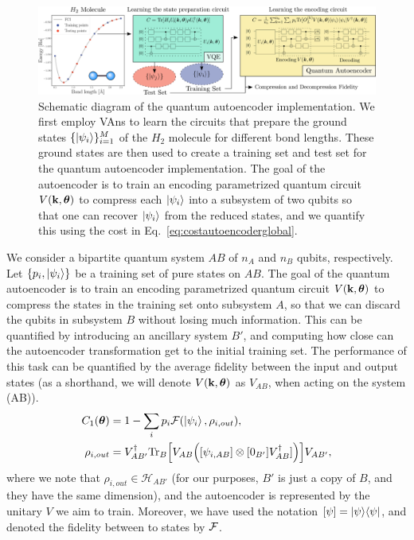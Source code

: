 \begin{figure}[t!]
\centering
\includegraphics[width=1.\textwidth]{Figures/VANS/Fig10.pdf}
\caption{Schematic diagram of the quantum autoencoder implementation. We first employ VAns to learn the circuits that prepare the ground states $\{\ket{\psi_i}\}_{i=1}^M$ of the $H_2$ molecule for different bond lengths. These ground states are then used to create a training set and test set for the quantum autoencoder implementation. The goal of the autoencoder is to train an encoding parametrized quantum circuit $V(\mathbf{k}, \bm{\theta})$ to compress each $\ket{\psi_i}$ into a subsystem of two qubits so that one can recover $\ket{\psi_i}$ from the reduced states, and we quantify this using the cost in Eq.~\ref{eq:costautoencoderglobal}.}
\label{fig:AE}
\end{figure}

We consider a bipartite quantum system $AB$ of $n_A$ and $n_B$ qubits, respectively. Let $\{p_i,\ket{\psi_i}\}$ be a training set of pure states on $AB$. The goal of the quantum autoencoder is to train an encoding parametrized quantum circuit $V(\mathbf{k}, \bm{\theta})$ to compress the states in the training set onto subsystem $A$, so that we can discard the qubits in subsystem $B$ without losing much information. This can be quantified by introducing an ancillary system $B'$, and computing how close can the autoencoder transformation get to the initial training set. The performance of this task can be quantified by the average fidelity between the input and output states (as a shorthand, we will denote $V(\mathbf{k}, \bm{\theta})$ as $V_{AB}$, when acting on the system (AB)).
\begin{align}C_1(\thv) &= 1- \sum_i p_i \cF(\ket{\psi_i}, \rho_{i,out}),\\
\rho_{i,out}&= V^\dagger_{AB'} \text{Tr}_B\Big[ V_{AB} \Big( [\psi_{i,AB}] \otimes [0_{B'}] V_{AB}^\dagger  ] \Big) \Big] V_{AB'},
\end{align}
where we note that $\rho_{i,out}\in \mathcal{H}_{AB'}$ (for our purposes, $B'$ is just a copy of $B$, and they have the same dimension), and the autoencoder is represented by the unitary $V$ we aim to train. Moreover, we have used the notation $[\psi] = \proj{\psi}$, and denoted the fidelity between to states by $\mathcal{F}$.

